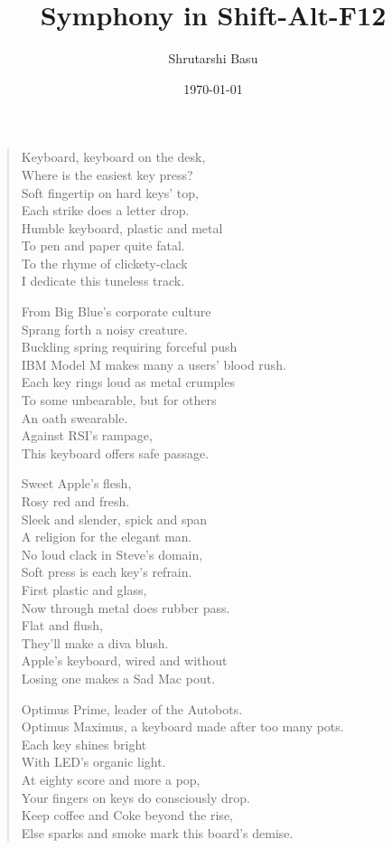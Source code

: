 \documentclass[11pt,letterpaper]{article}
\title{Symphony in Shift-Alt-F12}
\author{Shrutarshi Basu}
\date{\today}
\begin{document}
\maketitle
\begin{verse}
Keyboard, keyboard on the desk,\\ 
Where is the easiest key press?\\ 
Soft fingertip on hard keys' top,\\ 
Each strike does a letter drop.\\ 
Humble keyboard, plastic and metal\\ 
To pen and paper quite fatal.\\ 
To the rhyme of clickety-clack\\ 
I dedicate this tuneless track.

From Big Blue's corporate culture\\ 
Sprang forth a noisy creature.\\ 
Buckling spring requiring forceful push\\ 
IBM Model M makes many a users' blood rush.\\ 
Each key rings loud as metal crumples\\ 
To some unbearable, but for others\\ 
An oath swearable.\\ 
Against RSI's rampage,\\ 
This keyboard offers safe passage. 
 
Sweet Apple's flesh,\\ 
Rosy red and fresh.\\ 
Sleek and slender, spick and span\\ 
A religion for the elegant man.\\ 
No loud clack in Steve's domain,\\ 
Soft press is each key's refrain.\\ 
First plastic and glass,\\ 
Now through metal does rubber pass.\\ 
Flat and flush,\\ 
They'll make a diva blush.\\ 
Apple's keyboard, wired and without\\ 
Losing one makes a Sad Mac pout. 
 
Optimus Prime, leader of the Autobots.\\ 
Optimus Maximus, a keyboard made after too many pots.\\ 
Each key shines bright\\ 
With LED's organic light.\\ 
At eighty score and more a pop,\\ 
Your fingers on keys do consciously drop.\\ 
Keep coffee and Coke beyond the rise,\\ 
Else sparks and smoke mark this board's demise. 
 

\end{verse}
\end{document}
